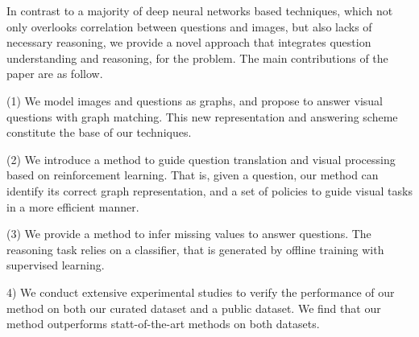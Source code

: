 \vspace{2ex}
 In contrast to a majority of deep neural networks based \vqa techniques, which not only overlooks correlation between questions and images, but also lacks of necessary reasoning, we provide a novel approach that integrates question understanding and reasoning, for the \vqa problem. The main contributions of the paper are as follow.  

(1) We model images and questions as graphs, and propose to answer visual questions with graph matching. This new representation and answering scheme constitute the base of our techniques.  

(2) We introduce a method to guide question translation and visual processing based on reinforcement learning. That is, given a question, our method can identify its correct graph representation, and a set of policies to guide visual tasks in a more efficient manner. 

(3) We provide a method to infer missing values to answer questions. The reasoning task relies on a classifier, that is generated by offline training with supervised learning. 

4) We conduct extensive experimental studies to verify the performance of our method on both our curated \vqa dataset and a public \vqa dataset. We find that our method outperforms statt-of-the-art methods on both datasets.